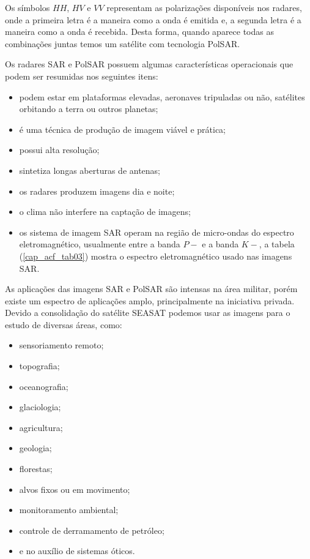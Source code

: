 Os símbolos $HH$, $HV$ e $VV$ representam as polarizações disponíveis nos radares, onde a primeira letra é a maneira como a onda é emitida e, a segunda letra é a maneira como a onda é recebida. Desta forma, quando aparece todas as combinações juntas temos um satélite com tecnologia PolSAR.

Os radares SAR e PolSAR possuem algumas características operacionais que podem ser resumidas nos seguintes itens:
\begin{itemize}
\item podem estar em plataformas elevadas, aeronaves tripuladas ou não, satélites orbitando a terra ou outros planetas;
\item é uma técnica de produção de imagem viável e prática;
\item possui alta resolução;
\item sintetiza longas aberturas de antenas;
\item os radares produzem imagens dia e noite;
\item o clima não interfere na captação de imagens;
\item os sistema de imagem SAR operam na região de micro-ondas do espectro eletromagnético, usualmente entre a banda $P-$ e a banda $K-$, a tabela (\ref{cap_acf_tab03}) mostra o espectro eletromagnético usado nas imagens SAR.
\end{itemize}
As aplicações das imagens SAR e PolSAR são intensas na área militar, porém existe um espectro de aplicações amplo, principalmente na iniciativa privada.  Devido a consolidação do satélite SEASAT podemos usar as imagens para o estudo de diversas áreas, como:
\begin{itemize}
\item sensoriamento remoto;
\item topografia;
\item oceanografia;
\item glaciologia;
\item agricultura;
\item geologia;
\item florestas;
\item alvos fixos ou em movimento;
\item monitoramento ambiental;
\item controle de derramamento de petróleo;
\item e no auxílio de sistemas óticos.
\end{itemize}

